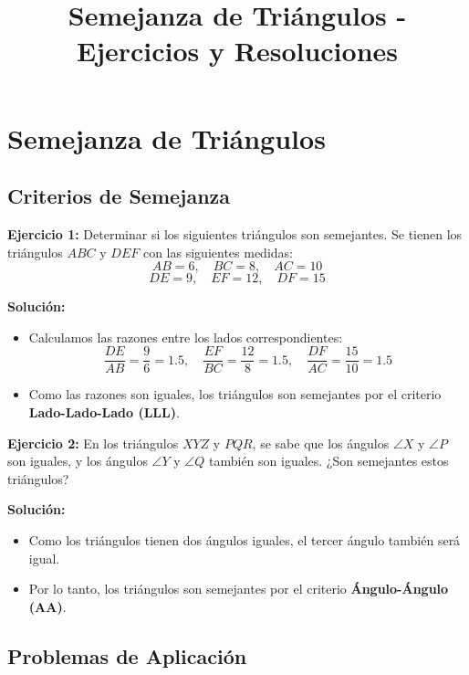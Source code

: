 \documentclass{profesor}
\title{Semejanza de Triángulos - Ejercicios y Resoluciones}
\begin{document}
\maketitle
\tableofcontents
\newpage

\section{Semejanza de Triángulos}

\subsection{Criterios de Semejanza}

\textbf{Ejercicio 1:}  
Determinar si los siguientes triángulos son semejantes. Se tienen los triángulos \( ABC \) y \( DEF \) con las siguientes medidas:  
\[
AB = 6, \quad BC = 8, \quad AC = 10
\]
\[
DE = 9, \quad EF = 12, \quad DF = 15
\]

\textbf{Solución:}  
\begin{itemize}
    \item Calculamos las razones entre los lados correspondientes:
    \[
    \frac{DE}{AB} = \frac{9}{6} = 1.5, \quad \frac{EF}{BC} = \frac{12}{8} = 1.5, \quad \frac{DF}{AC} = \frac{15}{10} = 1.5
    \]
    \item Como las razones son iguales, los triángulos son semejantes por el criterio \textbf{Lado-Lado-Lado (LLL)}.
\end{itemize}

\textbf{Ejercicio 2:}  
En los triángulos \( XYZ \) y \( PQR \), se sabe que los ángulos \( \angle X \) y \( \angle P \) son iguales, y los ángulos \( \angle Y \) y \( \angle Q \) también son iguales. ¿Son semejantes estos triángulos?

\textbf{Solución:}  
\begin{itemize}
    \item Como los triángulos tienen dos ángulos iguales, el tercer ángulo también será igual.
    \item Por lo tanto, los triángulos son semejantes por el criterio \textbf{Ángulo-Ángulo (AA)}.
\end{itemize}

\newpage
\subsection{Problemas de Aplicación}
\end{document}
